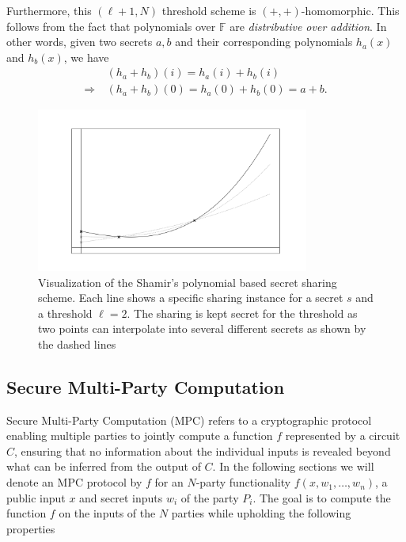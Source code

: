\documentclass[11pt]{report}
\theoremstyle{definition}
\theoremstyle{plain}
\begin{document}
Furthermore, this $(\ell + 1, N)$ threshold scheme is $(+, +)$-homomorphic. This follows from the fact that polynomials over $\mathbb{F}$ are \textit{distributive over addition}. In other words, given two secrets $a, b$ and their corresponding polynomials $h_a(x)$ and $h_b(x)$, we have
\begin{align*}
                & (h_a + h_b)(i) = h_a(i) + h_b(i)          \\
  \Rightarrow\  & (h_a + h_b)(0) = h_a(0) + h_b(0) = a + b.
\end{align*}

\begin{figure}
  \centering
  \includegraphics[width=0.8\textwidth]{images/shamir.png}
  \caption{Visualization of the Shamir's polynomial based secret sharing scheme. Each line shows a specific sharing instance for a secret $s$ and a threshold $\ell=2$. The sharing is kept secret for the threshold as two points can interpolate into several different secrets as shown by the dashed lines}\label{fig:shamir}
\end{figure}

\subsection{Secure Multi-Party Computation}\label{sec:mpc}

Secure Multi-Party Computation (MPC) refers to a cryptographic protocol enabling multiple parties to jointly compute a function $f$ represented by a circuit $C$, ensuring that no information about the individual inputs is revealed beyond what can be inferred from the output of $C$. In the following sections we will denote an MPC protocol by $f$ for an $N$-party functionality $f(x, w_1, \dots, w_n)$, a public input $x$ and secret inputs $w_i$ of the party $P_i$. The goal is to compute the function $f$ on the inputs of the $N$ parties while upholding the following properties~\cite{cramer2015secure}
\end{document}
